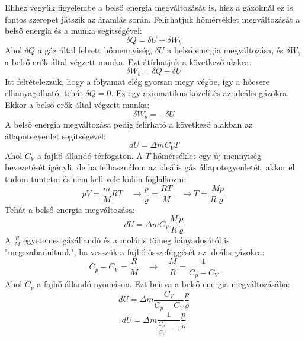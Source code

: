 \documentclass[../main.tex]{subfiles}
\begin{document}
Ehhez vegyük figyelembe a belső energia megváltozását is, hisz a gázoknál ez is fontos szerepet játszik az áramlás során.
Felírhatjuk hőmérséklet megváltozását a belső energia és a munka segítségével:
\begin{equation}
    \delta Q = \delta U + \delta W_b
\end{equation}
Ahol $\delta Q$ a gáz által felvett hőmennyiség, $\delta U$ a belső energia megváltozása, és $\delta W_b$ a belső erők által végzett munka.
Ezt átírhatjuk a következő alakra:
\begin{equation}
    \delta W_b = \delta Q - \delta U
\end{equation}
Itt feltételezzük, hogy a folyamat elég gyorsan megy végbe, így a hőcsere elhanyagolható, tehát $\delta Q = 0$. Ez egy axiomatikus közelítés az ideális gázokra.
Ekkor a belső erők által végzett munka:
\begin{equation}
    \delta W_b = - \delta U
\end{equation}
A belső energia megváltozása pedig felírható a következő alakban az állapotegyenlet segítségével:
\begin{equation}
    dU = \Delta m C_V T 
\end{equation}
Ahol $C_V$ a fajhő állandó térfogaton. A $T$ hőmérséklet egy új mennyiség bevezetését igényli, de ha felhasználom az ideális gáz állapotegyenletét,
akkor el tudom tüntetni és nem kell vele külön foglalkozni:
\begin{equation}
    pV = \frac{m}{M} RT \quad \rightarrow \frac{p}{\varrho} = \frac{RT}{M} \quad \rightarrow T = \frac{M p}{R \varrho}
\end{equation}
Tehát a belső energia megváltozása:
\begin{equation}
    dU = \Delta m C_V \frac{M}{R} \frac{p}{\varrho}
\end{equation}
A $\frac{R}{M}$ egyetemes gázállandó és a moláris tömeg hányadosától is "megszabadultunk", ha vesszük a fajhő összefüggését az ideális gázokra:
\begin{equation}
    C_p - C_V = \frac{R}{M} \quad \rightarrow \quad \frac{M}{R} = \frac{1}{C_p - C_V}
\end{equation}
Ahol $C_p$ a fajhő állandó nyomáson. Ezt beírva a belső energia megváltozásába:
\begin{equation}
    dU = \Delta m \frac{C_V}{C_p - C_V} \frac{p}{\varrho}
\end{equation}
\begin{equation}
    dU = \Delta m \frac{1}{\frac{C_p}{C_V} -1} \frac{p}{\varrho}
\end{equation}
\end{document}
